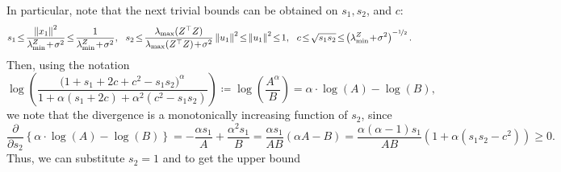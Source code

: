 \documentclass[11pt]{article}
\theoremstyle{definition}
\theoremstyle{plain}
\newcommand{\Norm}[1]{\left\| #1 \right\|}
\providecommand{\norm}[1]{\Norm{#1}}
\begin{document}
In particular, note that the next trivial bounds can be obtained on $s_1, s_2$, and $c$:
\begin{equation}
    s_1 \hspace{-0.15em}\leq\hspace{-0.15em} \frac{\norm{x_1}^2}{\lambda^{Z}_{\min} \hspace{-0.15em}+\hspace{-0.15em} \sigma^2} \hspace{-0.15em}\leq\hspace{-0.15em} \frac{1}{\lambda^{Z}_{\min} \hspace{-0.15em}+\hspace{-0.15em} \sigma^2},\ \ s_2 \hspace{-0.15em}\leq\hspace{-0.15em} \frac{\lambda_{\max}(Z^{\top}Z)}{\lambda_{\max}(Z^{\top}Z) \hspace{-0.15em}+\hspace{-0.15em} \sigma^2}\norm{u_1}^2 \hspace{-0.15em}\leq\hspace{-0.15em} \norm{u_1}^2 \hspace{-0.15em}\leq\hspace{-0.15em} 1, \ \ c \hspace{-0.15em}\leq\hspace{-0.15em} \sqrt{s_1s_2} \hspace{-0.15em}\leq\hspace{-0.15em} \left(\lambda^{Z}_{\min} \hspace{-0.15em}+\hspace{-0.15em} \sigma^2\right)^{-\nicefrac{1}{2}}. 
\end{equation}
Then, using the notation 
\begin{equation}
    \log\left(\frac{\big(1+ s_1 + 2c + c^2 - s_1 s_2\big)^{\alpha}}{1 + \alpha\left( s_1 + 2c\right) + \alpha^2 \left(c^2 - s_1 s_2\right)}\right)\coloneq \log\left(\frac{A^{\alpha}}{B}\right) = \alpha \cdot \log(A) - \log(B),
\end{equation}
we note that the divergence is a monotonically increasing function of $s_2$, since
\begin{equation}
    \frac{\partial}{\partial s_2} \left\{\alpha \cdot \log(A) - \log(B)\right\} = -\frac{\alpha s_1}{A} + \frac{\alpha^2 s_1}{B} = \frac{\alpha s_1}{AB}\left(\alpha A - B\right) = \frac{\alpha(\alpha - 1) s_1}{AB}\left(1 + \alpha(s_1s_2 - c^2) \right) \geq 0.
\end{equation}
Thus, we can substitute $s_2 = 1$ and to get the upper bound 
\end{document}
